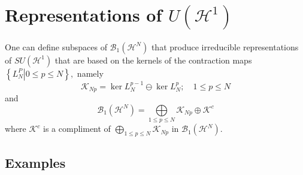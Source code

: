 \documentclass[aps,preprint]{revtex4}%
\begin{document}
\section{Representations of $U\left(  \mathcal{H}^{1}\right)  $}

One can define subspaces of $\mathcal{B}_{1}\left(  \mathcal{H}^{N}\right)  $
that produce irreducible representations of $SU\left(  \mathcal{H}^{1}\right)
$ that are based on the kernels of the contraction maps $\left\{  \left.
L_{N}^{P}\right\vert 0\leq p\leq N\right\}  ,$ namely
\begin{equation}
\mathcal{K}_{Np}=\ker L_{N}^{p-1}\ominus\ker L_{N}^{p};\quad1\leq p\leq N
\end{equation}
and
\begin{equation}
\mathcal{B}_{1}\left(  \mathcal{H}^{N}\right)  =%
{\textstyle\bigoplus\limits_{1\leq p\leq N}}
\mathcal{K}_{Np}\oplus\mathcal{K}^{c}%
\end{equation}
where $\mathcal{K}^{c}$ is a compliment of $%
{\textstyle\bigoplus\limits_{1\leq p\leq N}}
\mathcal{K}_{Np}$ in $\mathcal{B}_{1}\left(  \mathcal{H}^{N}\right)  $.

\subsection{Examples}
\end{document}

